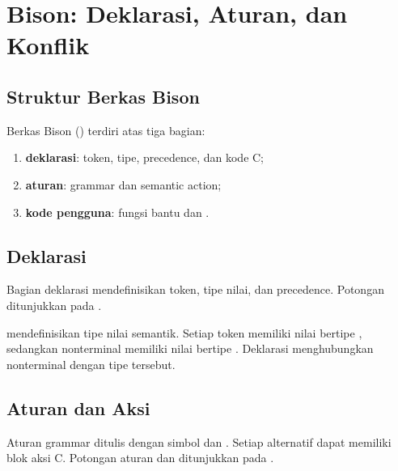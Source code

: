 \section{Bison: Deklarasi, Aturan, dan Konflik}
\label{sec:ch13-bison}

\subsection{Struktur Berkas Bison}

Berkas Bison () terdiri atas tiga bagian:
\begin{enumerate}[label=\arabic*.,leftmargin=*]
  \item \textbf{deklarasi}: token, tipe, precedence, dan kode C;
  \item \textbf{aturan}: grammar dan semantic action;
  \item \textbf{kode pengguna}: fungsi bantu dan .
\end{enumerate}

\subsection{Deklarasi}

Bagian deklarasi mendefinisikan token, tipe nilai, dan precedence.
Potongan  ditunjukkan pada .


 mendefinisikan tipe nilai semantik. Setiap token
memiliki nilai bertipe , sedangkan nonterminal memiliki
nilai bertipe . Deklarasi  menghubungkan
nonterminal dengan tipe tersebut.

\subsection{Aturan dan Aksi}

Aturan grammar ditulis dengan simbol \code{:} dan \code{|}. Setiap
alternatif dapat memiliki blok aksi C. Potongan aturan
 dan  ditunjukkan pada
.


